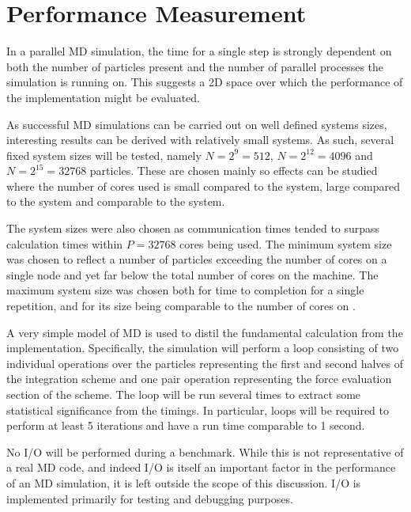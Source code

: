 \section{Performance Measurement}

%
In a parallel MD simulation, the time for a single step is strongly dependent
on both the number of particles present and
the number of parallel processes the simulation is running on.
%
This suggests a 2D space over which the performance of the implementation
might be evaluated.

%
As successful MD simulations can be carried out on well defined
systems sizes, interesting results can be derived with relatively
small systems.
%
As such, several fixed system sizes will be tested, namely
$N = 2^{9} = 512$,
$N = 2^{12} = 4096$ and
$N = 2^{15} = 32768$
particles.
%
These are chosen mainly so effects can be studied where the number of cores
used is small compared to the system, large compared to the system
and comparable to the system.

The system sizes were also chosen as communication times
tended to surpass calculation times within $P = 32768$ cores
being used.
%
The minimum system size was chosen to reflect a number of particles
exceeding the number of cores on a single \hector{} node and yet far
below the total number of cores on the machine.
%
The maximum system size was chosen both for time to completion for
a single repetition, and for its size being comparable to the number of
cores on \hector{}.

%
A very simple model of MD is used to distil the fundamental calculation
from the implementation.
%
Specifically, the simulation will perform a loop consisting of two
individual operations over the particles representing the first
and second halves of the \velocityverlet{} integration scheme and one
pair operation representing the force evaluation section of the scheme.
%
The loop will be run several times to extract some statistical significance
from the timings.
%
In particular, loops will be required to perform at least 5 iterations
and have a run time comparable to 1 second.

%
No I/O will be performed during a benchmark.
%
While this is not representative of a real MD code, and indeed I/O
is itself an important factor in the performance of an MD simulation,
it is left outside the scope of this discussion.
%
I/O is implemented primarily for testing and debugging purposes.

